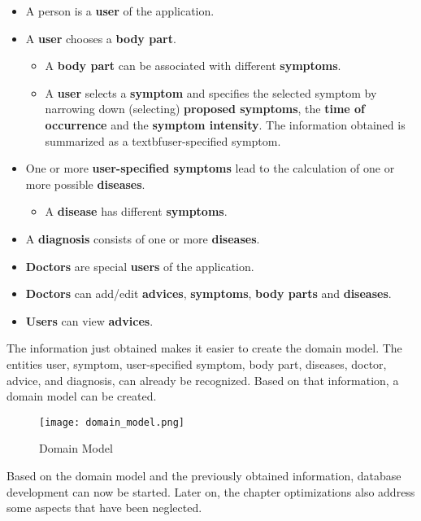 \begin{itemize}
	\item A person is a \textbf{user} of the application.
	\item A \textbf{user} chooses a \textbf{body part}.
	\begin{itemize}
		\item A \textbf{body part} can be associated with different \textbf{symptoms}.
		\item A \textbf{user} selects a \textbf{symptom} and specifies the selected symptom by narrowing down (selecting) \textbf{proposed symptoms}, the \textbf{time of occurrence} and the \textbf{symptom intensity}. The information obtained is summarized as a textbf{user-specified symptom}.
	\end{itemize}
	\item One or more \textbf{user-specified symptoms} lead to the calculation of one or more possible \textbf{diseases}.
	\begin{itemize}
		\item A \textbf{disease} has different \textbf{symptoms}.
	\end{itemize}
	\item A \textbf{diagnosis} consists of one or more \textbf{diseases}.
	\item \textbf{Doctors} are special \textbf{users} of the application.
	\item \textbf{Doctors} can add/edit \textbf{advices}, \textbf{symptoms}, \textbf{body parts} and \textbf{diseases}.
	\item \textbf{Users} can view \textbf{advices}.  
\end{itemize}
\noindent
The information just obtained makes it easier to create the domain model. The entities user, symptom, user-specified symptom, body part, diseases, doctor, advice, and diagnosis, can already be recognized. Based on that information, a domain model can be created. 
\begin{figure}[H]
	\centering
	\texttt{[image: domain\_model.png]}
	\caption[Domain Model]{Domain Model}
\end{figure}
\noindent
Based on the domain model and the previously obtained information, database development can now be started. Later on, the chapter optimizations also address some aspects that have been neglected.


